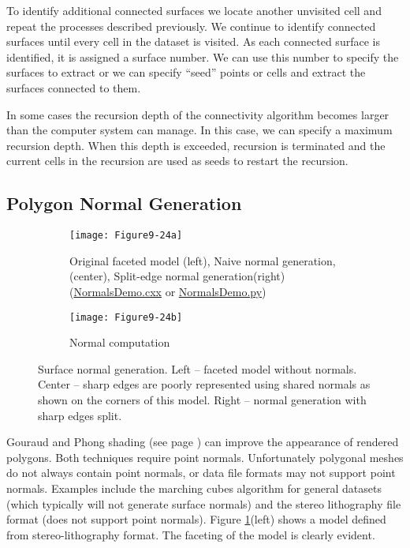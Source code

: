 To identify additional connected surfaces we locate another unvisited cell and repeat the processes described previously. We continue to identify connected surfaces until every cell in the dataset is visited. As each connected surface is identified, it is assigned a surface number. We can use this number to specify the surfaces to extract or we can specify ``seed'' points or cells and extract the surfaces connected to them.

In some cases the recursion depth of the connectivity algorithm becomes larger than the computer system can manage. In this case, we can specify a maximum recursion depth. When this depth is exceeded, recursion is terminated and the current cells in the recursion are used as seeds to restart the recursion.

\subsection{Polygon Normal Generation}

\begin{figure}[htb]
    \centering
	\begin{subfigure}[h]{0.96\linewidth}
		\texttt{[image: Figure9-24a]}
		\captionsetup{justification=centering}
		\caption{Original faceted model (left), Naive normal generation,(center), Split-edge normal generation(right) (\href{https://lorensen.github.io/VTKExamples/site/Cxx/Visualization/NormalsDemo/}{NormalsDemo.cxx} or \href{https://lorensen.github.io/VTKExamples/site/Python/Visualization/NormalsDemo/}{NormalsDemo.py})}
		\label{fig:Figure9-24a}
	\end{subfigure}
	\hfill
	\begin{subfigure}[h]{0.4\linewidth}
		\texttt{[image: Figure9-24b]}
		\captionsetup{justification=centering}
		\caption{Normal computation}
		\label{fig:Figure9-24b}
	\end{subfigure}
	\caption{ Surface normal generation. Left -- faceted model without normals. Center -- sharp edges are poorly represented using shared normals as shown on the corners of this model. Right -- normal generation with sharp edges split.}\label{fig:Figure9-24}
\end{figure}

Gouraud and Phong shading (see page \pageref{subsection:rasterization.phong}) can improve the appearance of rendered polygons. Both techniques require point normals. Unfortunately polygonal meshes do not always contain point normals, or data file formats may not support point normals. Examples include the marching cubes algorithm for general datasets (which typically will not generate surface normals) and the stereo lithography file format (does not support point normals). Figure \ref{fig:Figure9-24a}(left) shows a model defined from stereo-lithography format. The faceting of the model is clearly evident.


